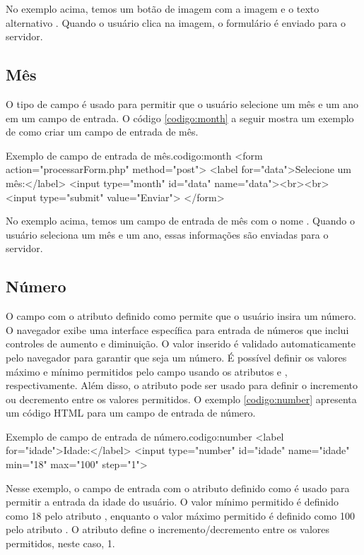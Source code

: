 No exemplo acima, temos um botão de imagem com a imagem  e o texto alternativo . Quando o usuário clica na imagem, o formulário é enviado para o servidor.

\subsection{Mês}

O tipo de campo  é usado para permitir que o usuário selecione um mês e um ano em um campo de entrada. O código \ref{codigo:month} a seguir mostra um exemplo de como criar um campo de entrada de mês.

\begin{htmlcode}{Exemplo de campo de entrada de mês.}{codigo:month}
<form action="processarForm.php" method="post">
   <label for="data">Selecione um mês:</label>
   <input type="month" id="data" name="data"><br><br>
   <input type="submit" value="Enviar">
</form>
\end{htmlcode}

No exemplo acima, temos um campo de entrada de mês com o nome . Quando o usuário seleciona um mês e um ano, essas informações são enviadas para o servidor.

\subsection{Número}

O campo  com o atributo  definido como  permite que o usuário insira um número. O navegador exibe uma interface específica para entrada de números que inclui controles de aumento e diminuição. O valor inserido é validado automaticamente pelo navegador para garantir que seja um número. É possível definir os valores máximo e mínimo permitidos pelo campo usando os atributos  e , respectivamente. Além disso, o atributo  pode ser usado para definir o incremento ou decremento entre os valores permitidos. O exemplo \ref{codigo:number} apresenta um código HTML para um campo de entrada de número.

\begin{htmlcode}{Exemplo de campo de entrada de número.}{codigo:number}
<label for="idade">Idade:</label>
<input type="number" id="idade" name="idade" min="18" max="100" step="1">
\end{htmlcode}

Nesse exemplo, o campo de entrada  com o atributo  definido como  é usado para permitir a entrada da idade do usuário. O valor mínimo permitido é definido como 18 pelo atributo , enquanto o valor máximo permitido é definido como 100 pelo atributo . O atributo  define o incremento/decremento entre os valores permitidos, neste caso, 1.

